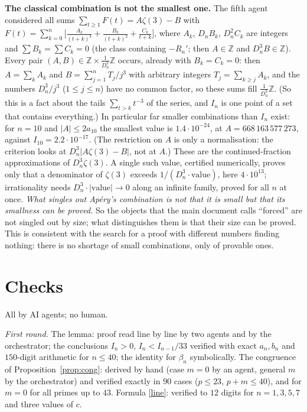 \documentclass[11pt]{article}
\newcommand{\Z}{\mathbb Z}
\newcommand{\q}[1]{\medskip\noindent\textbf{#1}}
\begin{document}
\q{The classical combination is not the smallest one.} The fifth agent considered all sums
$\sum_{t\ge1}F(t)=A\zeta(3)-B$ with
$F(t)=\sum_{k=0}^n\bigl[\frac{A_k}{(t+k)^3}+\frac{B_k}{(t+k)^2}+\frac{C_k}{t+k}\bigr]$, where $A_k$,
$D_nB_k$, $D_n^2C_k$ are integers and $\sum B_k=\sum C_k=0$ (the class containing $-R_n'$; then
$A\in\Z$ and $D_n^3B\in\Z$). Every pair $(A,B)\in\Z\times\frac1{D_n^3}\Z$ occurs, already with
$B_k=C_k=0$: then $A=\sum_kA_k$ and $B=\sum_{j=1}^nT_j/j^3$ with arbitrary integers
$T_j=\sum_{k\ge j}A_k$, and the numbers $D_n^3/j^3$ ($1\le j\le n$) have no common factor, so these
sums fill $\frac1{D_n^3}\Z$. (So this is a fact about the tails $\sum_{t>k}t^{-3}$ of the series, and
$I_n$ is one point of a set that contains everything.) In particular far smaller combinations than
$I_n$ exist: for $n=10$ and $|A|\le2a_{10}$ the smallest value is $1.4\cdot10^{-24}$, at
$A=668\,163\,577\,273$, against $I_{10}=2.2\cdot10^{-17}$. (The restriction on $A$ is only a
normalisation: the criterion looks at $D_n^3|A\zeta(3)-B|$, not at $A$.) These are the
continued-fraction approximations of $D_n^3\zeta(3)$. A single such value, certified numerically,
proves only that a denominator of $\zeta(3)$ exceeds $1/(D_n^3\cdot\text{value})$, here
$4\cdot10^{13}$; irrationality needs $D_n^3\cdot|\text{value}|\to0$ along an infinite family, proved
for all $n$ at once. \emph{What singles out Ap\'ery's combination is not that it is small but that
its smallness can be proved.} So the objects that the main document calls ``forced'' are not singled
out by size; what distinguishes them is that their size can be proved. This is consistent with the
search for a proof with different numbers finding nothing: there is no shortage of small
combinations, only of provable ones.

\section{Checks}
All by AI agents; no human.

\emph{First round.} The lemma: proof read line by line by two agents and by the orchestrator; the
conclusions $I_n>0$, $I_n<I_{n-1}/33$ verified with exact $a_n,b_n$ and $150$-digit arithmetic for
$n\le40$; the identity for $\beta_n$ symbolically. The congruence of Proposition~\ref{prop:cong}:
derived by hand (case $m=0$ by an agent, general $m$ by the orchestrator) and verified exactly in
$90$ cases ($p\le23$, $p+m\le40$), and for $m=0$ for all primes up to $43$. Formula \eqref{line}:
verified to $12$ digits for $n=1,3,5,7$ and three values of $c$.
\end{document}
